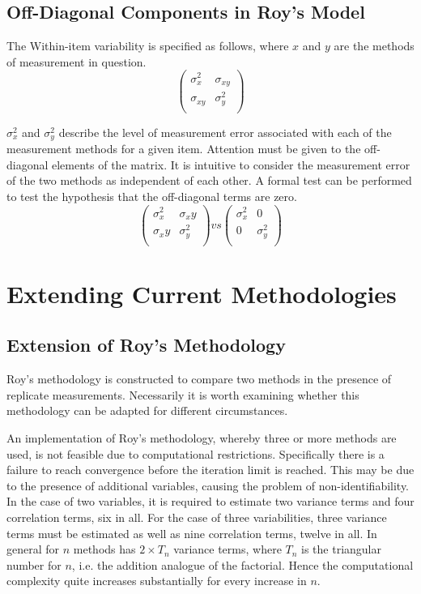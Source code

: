 \documentclass[12pt, a4paper]{report}
\theoremstyle{plain}
\theoremstyle{definition}
\theoremstyle{remark}
\begin{document}
\section{Off-Diagonal Components in Roy's Model}

The Within-item variability is specified as follows, where $x$ and $y$ are the methods of measurement in question.
\[ \left(
\begin{array}{cc}
\sigma^2_x & \sigma_{xy} \\
\sigma_{xy} & \sigma^2_y \\
\end{array}
\right)
\]

$\sigma^2_x$ and $\sigma^2_y$ describe the level of measurement error associated with each of the measurement methods for a given item. Attention must be given to the off-diagonal elements of the matrix. It is intuitive to consider the measurement error of the two methods as independent of each other. A formal test can be performed to test the hypothesis that the off-diagonal terms are zero.
\[ \left(
\begin{array}{cc}
\sigma^2_x & \sigma_xy \\
\sigma_xy & \sigma^2_y \\
\end{array}
\right) vs \left(
\begin{array}{cc}
\sigma^2_x & 0 \\
0 & \sigma^2_y \\
\end{array}
\right)
\]





\chapter{Extending Current Methodologies}
\section{Extension of Roy's Methodology}
Roy's methodology is constructed to compare two methods in the presence of replicate measurements. Necessarily it is worth examining whether this methodology can be adapted for different circumstances.

An implementation of Roy's methodology, whereby three or more methods are used, is not feasible due to computational restrictions. Specifically there is a failure to reach convergence before the iteration limit is reached. This may be due to the presence of additional variables, causing the problem of non-identifiability. In the case of two variables, it is required to estimate two variance terms and four correlation terms, six in all. For the case of three variabilities, three variance terms must be estimated as well as nine correlation terms, twelve in all. In general for $n$ methods has $2 \times T_{n}$ variance terms, where $T_n$ is the triangular number for $n$, i.e. the addition analogue of the factorial. Hence the computational complexity quite increases substantially for every increase in $n$.
\end{document}
